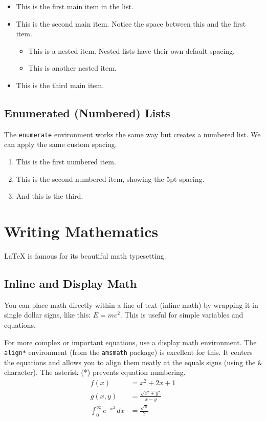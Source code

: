 \documentclass{article}
\begin{document}
\begin{itemize}[itemsep=5pt]
    \item This is the first main item in the list.
    \item This is the second main item. Notice the space between this and the first item.
        \begin{itemize}
            \item This is a nested item. Nested lists have their own default spacing.
            \item This is another nested item.
        \end{itemize}
    \item This is the third main item.
\end{itemize}

\subsection{Enumerated (Numbered) Lists}
The \texttt{enumerate} environment works the same way but creates a numbered list. We can apply the same custom spacing.

\begin{enumerate}[itemsep=5pt]
    \item This is the first numbered item.
    \item This is the second numbered item, showing the 5pt spacing.
    \item And this is the third.
\end{enumerate}

\bigskip %


\section{Writing Mathematics}
LaTeX is famous for its beautiful math typesetting.

\subsection{Inline and Display Math}
You can place math directly within a line of text (inline math) by wrapping it in single dollar signs, like this: $E = mc^2$. This is useful for simple variables and equations.

For more complex or important equations, use a display math environment. The \texttt{align*} environment (from the \texttt{amsmath} package) is excellent for this. It centers the equations and allows you to align them neatly at the equals signs (using the \texttt{\&} character). The asterisk (*) prevents equation numbering.
\begin{align*}
    f(x) &= x^2 + 2x + 1 \\
    g(x,y) &= \frac{\sqrt{x^2 + y^2}}{x - y} \\
    \int_0^\infty e^{-x^2}\,dx &= \frac{\sqrt{\pi}}{2}
\end{align*}
\end{document}
